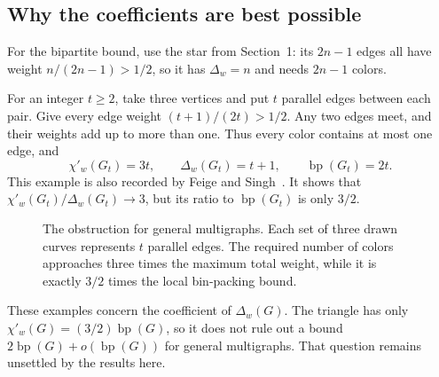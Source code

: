 \documentclass[11pt]{article}
\theoremstyle{definition}\newtheorem{algorithm}{Algorithm}[section]
\numberwithin{equation}{section}
\theoremstyle{remark}\newtheorem*{remark}{Remark}
\newcommand{\bp}{\operatorname{bp}}
\begin{document}
\subsection{Why the coefficients are best possible}
For the bipartite bound, use the star from Section~1: its $2n-1$ edges
all have weight $n/(2n-1)>1/2$, so it has $\Delta_w=n$ and needs
$2n-1$ colors.

For an integer $t\ge2$, take three vertices and put $t$ parallel edges
between each pair. Give every edge weight $(t+1)/(2t)>1/2$.
Any two edges meet, and their weights add up to more than one.
Thus every color contains at most one edge, and
\begin{equation}
 \chi'_w(G_t)=3t,\qquad
 \Delta_w(G_t)=t+1,\qquad \bp(G_t)=2t.
 \label{eq:general-triangle}
\end{equation}
This example is also recorded by Feige and Singh~\cite[Section~1.2]{FS}.
It shows that $\chi'_w(G_t)/\Delta_w(G_t)\to3$, but its ratio to
$\bp(G_t)$ is only $3/2$.

\begin{figure}[htbp]
\centering
{}
\caption{The obstruction for general multigraphs. Each set of three
drawn curves represents $t$ parallel edges. The required number of
colors approaches three times the maximum total weight, while it is
exactly $3/2$ times the local bin-packing bound.}
\label{fig:general-triangle}
\end{figure}


These examples concern the coefficient of $\Delta_w(G)$. The triangle
has only $\chi'_w(G)=(3/2)\bp(G)$, so it does not rule out a bound
$2\bp(G)+o(\bp(G))$ for general multigraphs. That question remains
unsettled by the results here.
\end{document}
